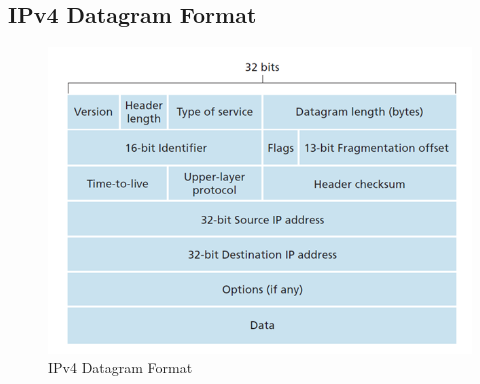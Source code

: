 \documentclass[a4paper]{article}
\theoremstyle{plain}
\theoremstyle{definition}
\begin{document}
\subsection{IPv4 Datagram Format}
\begin{figure}[!h]
    \centering
    \includegraphics[scale=0.5]{cn5.png}
    \caption{IPv4 Datagram Format}
    \label{fig:my_label_6}
\end{figure}
\end{document}
